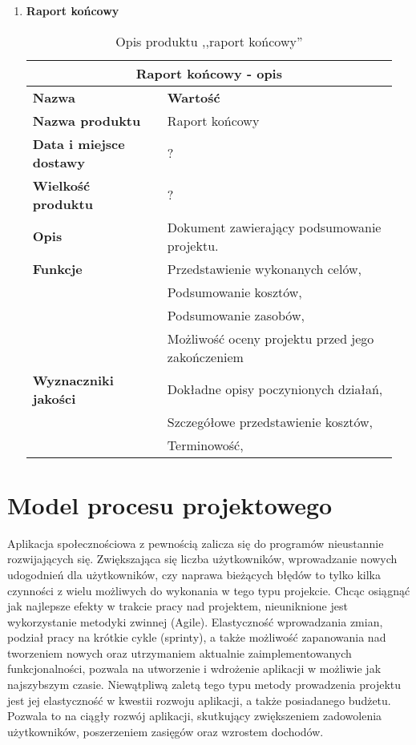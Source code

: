 \documentclass[12pt,a4paper]{article}
\begin{document}
\begin{enumerate}
    \item \textbf{Raport końcowy}
    \begin{table}[htb]
    \centering
      \begin{tabular}{|p{0.35\linewidth} | p{0.6\linewidth}|}
      \hline
      \multicolumn{2}{|c|}{Raport końcowy - opis} \\
      \hline
      {\bf Nazwa} & {\bf Wartość} \\
      \hline
      \textbf{Nazwa produktu} & Raport końcowy \\
      \hline
      \textbf{Data i miejsce dostawy} & ? \\
      \hline
      \textbf{Wielkość produktu} & ? \\
      \hline
      \textbf{Opis} & Dokument zawierający podsumowanie projektu.  \\
      \hline
      \textbf{Funkcje} 
                      & Przedstawienie wykonanych celów, \\
                      & Podsumowanie kosztów, \\
                      & Podsumowanie zasobów, \\
                      & Możliwość oceny projektu przed jego zakończeniem \\
      \hline
      \textbf{Wyznaczniki jakości} 
                      & Dokładne opisy poczynionych działań, \\
                      & Szczegółowe przedstawienie kosztów, \\
                      & Terminowość, \\
      \hline
      \end{tabular}
    \caption{Opis produktu ,,raport końcowy''}
    \label{tab:produkt3}
    \end{table}
\end{enumerate}

\newpage

\section{Model procesu projektowego}

Aplikacja społecznościowa z pewnością zalicza się do programów nieustannie rozwijających się. Zwiększająca się liczba użytkowników, wprowadzanie nowych udogodnień dla użytkowników, czy naprawa bieżących błędów to tylko kilka czynności z wielu możliwych do wykonania w tego typu projekcie. Chcąc osiągnąć jak najlepsze efekty w trakcie pracy nad projektem, nieuniknione jest wykorzystanie metodyki zwinnej (Agile). Elastyczność wprowadzania zmian, podział pracy na krótkie cykle (sprinty), a także możliwość zapanowania nad tworzeniem nowych oraz utrzymaniem aktualnie zaimplementowanych funkcjonalności, pozwala na utworzenie i wdrożenie aplikacji w możliwie jak najszybszym czasie. Niewątpliwą zaletą tego typu metody prowadzenia projektu jest jej elastyczność w kwestii rozwoju aplikacji, a także posiadanego budżetu. Pozwala to na ciągły rozwój aplikacji, skutkujący zwiększeniem zadowolenia użytkowników, poszerzeniem zasięgów oraz wzrostem dochodów. 
\end{document}
